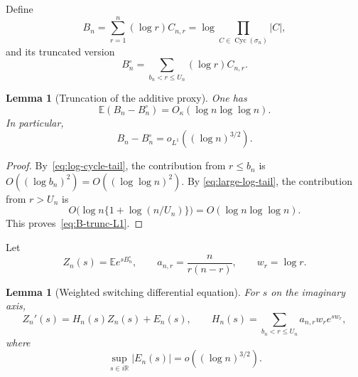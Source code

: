 \documentclass[11pt]{article}
\newtheorem{lemma}[theorem]{Lemma}
\theoremstyle{remark}
\newcommand{\Ee}{\mathbb E}
\newcommand{\Cyc}{\operatorname{Cyc}}
\begin{document}
Define
\begin{equation}\label{eq:B-def}
 B_n=\sum_{r=1}^n(\log r)C_{n,r}
 =\log\prod_{C\in\Cyc(\sigma_n)}|C|,
\end{equation}
and its truncated version
\begin{equation}\label{eq:Bcirc-def}
 B_n^\circ=\sum_{b_n<r\leq U_n}(\log r)C_{n,r}.
\end{equation}

\begin{lemma}[Truncation of the additive proxy]\label{lem:B-trunc}
One has
\begin{equation}\label{eq:B-trunc-L1}
 \Ee(B_n-B_n^\circ)=O_\kappa(\log n\log\log n).
\end{equation}
In particular,
\[
 B_n-B_n^\circ=o_{L^1}((\log n)^{3/2}).
\]
\end{lemma}

\begin{proof}
By~\eqref{eq:log-cycle-tail}, the contribution from $r\leq b_n$ is
$O((\log b_n)^2)=O((\log\log n)^2)$.  By
\eqref{eq:large-log-tail}, the contribution from $r>U_n$ is
\[
 O\bigl(\log n\{1+\log(n/U_n)\}\bigr)
 =O(\log n\log\log n).
\]
This proves~\eqref{eq:B-trunc-L1}.
\end{proof}

Let
\[
 Z_n(s)=\Ee e^{sB_n^\circ},
 \qquad
 a_{n,r}=\frac{n}{r(n-r)},
 \qquad
 w_r=\log r.
\]

\begin{lemma}[Weighted switching differential equation]
\label{lem:weighted-ode}
For $s$ on the imaginary axis,
\begin{equation}\label{eq:weighted-ode}
 Z_n'(s)=H_n(s)Z_n(s)+E_n(s),
 \qquad
 H_n(s)=\sum_{b_n<r\leq U_n}a_{n,r}w_re^{sw_r},
\end{equation}
where
\begin{equation}\label{eq:E-small}
 \sup_{s\in i\mathbb R}|E_n(s)|=o((\log n)^{3/2}).
\end{equation}
\end{lemma}
\end{document}
